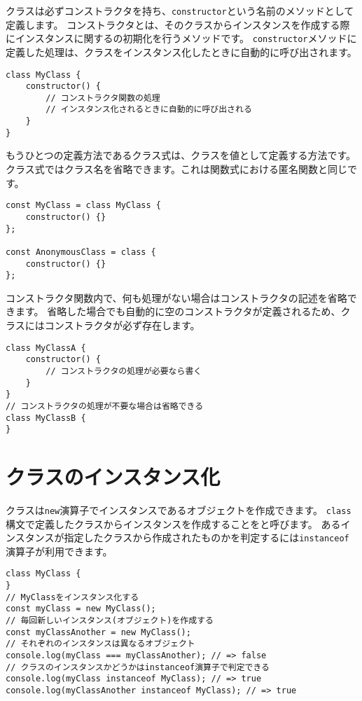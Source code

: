 クラスは必ずコンストラクタを持ち、\texttt{constructor}という名前のメソッドとして定義します。
コンストラクタとは、そのクラスからインスタンスを作成する際にインスタンスに関する\textbf{}の初期化を行うメソッドです。
\texttt{constructor}メソッドに定義した処理は、クラスをインスタンス化したときに自動的に呼び出されます。

\begin{lstlisting}
class MyClass {
    constructor() {
        // コンストラクタ関数の処理
        // インスタンス化されるときに自動的に呼び出される
    }
}
\end{lstlisting}

もうひとつの定義方法であるクラス式は、クラスを値として定義する方法です。
クラス式ではクラス名を省略できます。これは関数式における匿名関数と同じです。

\begin{lstlisting}
const MyClass = class MyClass {
    constructor() {}
};

const AnonymousClass = class {
    constructor() {}
};
\end{lstlisting}

コンストラクタ関数内で、何も処理がない場合はコンストラクタの記述を省略できます。
省略した場合でも自動的に空のコンストラクタが定義されるため、クラスにはコンストラクタが必ず存在します。

\begin{lstlisting}
class MyClassA {
    constructor() {
        // コンストラクタの処理が必要なら書く
    }
}
// コンストラクタの処理が不要な場合は省略できる
class MyClassB {
}
\end{lstlisting}

\hypertarget{class-instance}{%
\section{クラスのインスタンス化}\label{class-instance}}

クラスは\texttt{new}演算子でインスタンスであるオブジェクトを作成できます。
\texttt{class}構文で定義したクラスからインスタンスを作成することを\textbf{}と呼びます。
あるインスタンスが指定したクラスから作成されたものかを判定するには\texttt{instanceof}演算子が利用できます。

\begin{lstlisting}
class MyClass {
}
// MyClassをインスタンス化する
const myClass = new MyClass();
// 毎回新しいインスタンス(オブジェクト)を作成する
const myClassAnother = new MyClass();
// それぞれのインスタンスは異なるオブジェクト
console.log(myClass === myClassAnother); // => false
// クラスのインスタンスかどうかはinstanceof演算子で判定できる
console.log(myClass instanceof MyClass); // => true
console.log(myClassAnother instanceof MyClass); // => true
\end{lstlisting}

